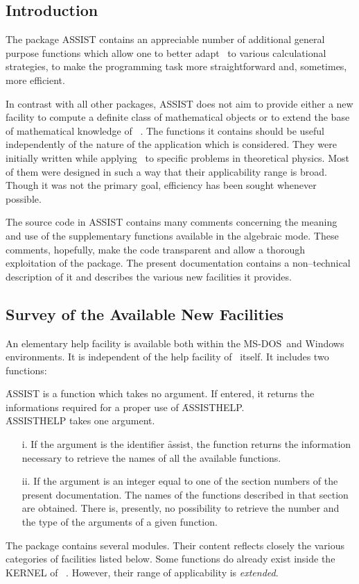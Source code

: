 \subsection{Introduction}
 The package ASSIST contains
an appreciable number of additional general purpose functions which allow
one to better adapt \REDUCE\ to various calculational strategies,
to make the programming task more straightforward and, sometimes, 
more efficient.

In contrast with all other packages, ASSIST does not aim to provide either a
new facility to compute a definite class of mathematical objects or to extend
the base of mathematical knowledge of \REDUCE\ .
The functions it contains should be
useful independently of the nature of the application which is considered.
They were initially written while applying \REDUCE\ to specific problems in
theoretical physics. Most of them were designed
in such a way that their applicability range is broad. Though it was not
the primary goal, efficiency has been sought whenever possible.

The source code in ASSIST contains many comments concerning
the meaning and use of the supplementary functions available
in the algebraic mode. These comments, hopefully, make the code transparent
and allow a thorough exploitation of the package. The present documentation
contains a non--technical description of it and describes the
various new facilities it provides.
\subsection{ Survey of the Available New Facilities}
An elementary help facility is available both within
the MS-DOS\ and Windows environments. It is independent of the
help facility of \REDUCE\ itself. It includes two functions:

\f{ASSIST} is a function which takes no argument. If entered, it returns 
the informations required for a proper use  of \f{ASSISTHELP}.\\   
\f{ASSISTHELP} takes one argument.   
\begin{itemize}
\item[i.] If the argument is the identifier \f{assist}, the function 
returns the information necessary to retrieve the names of all the available
functions.
\item[ii.] If the argument is an integer equal to one of the section numbers
of the present documentation. The names of the functions described
in that section are obtained.\linebreak
There is, presently, no possibility to retrieve the number and the type of 
the arguments of a given function.
\end{itemize}
The package contains several modules. Their content reflects closely
the various categories of facilities listed below. Some functions do
already exist inside the KERNEL of \REDUCE\ . However, their range
of applicability is {\em extended}.\linebreak

